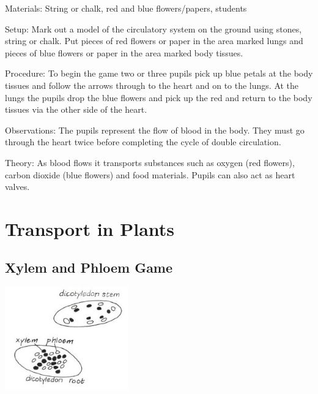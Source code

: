 \begin{multicols}{2}
\begin{description*}
\item[Materials:]{String or chalk, red and blue flowers/papers, students}
\item[Setup:]{Mark out a model of the circulatory system on the ground using stones, string or chalk. Put
pieces of red flowers or paper in the area marked lungs and pieces of blue flowers or paper in
the area marked body tissues. }
\item[Procedure:]{To begin the game two or three pupils pick up blue petals at
the body tissues and follow the arrows through to the heart and on to the lungs. At the lungs
the pupils drop the blue flowers and pick up the red and return to the body tissues via the
other side of the heart.}
\item[Observations:]{The pupils represent the flow of blood in the body. They must go through the heart twice
before completing the cycle of double circulation. }
\item[Theory:]{As blood flows it transports substances
such as oxygen (red flowers), carbon dioxide (blue flowers) and food materials. Pupils can
also act as heart valves.}
\end{description*}


\section*{Transport in Plants}  


\subsection{Xylem and Phloem Game}   %

\begin{center}
\includegraphics[width=0.4\textwidth]{./img/vso/xylem-phloem.jpg}
\end{center}


\end{multicols}
